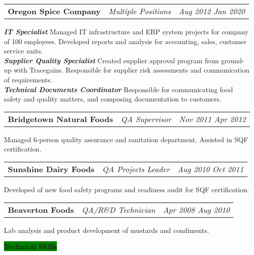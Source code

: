 \documentclass[letterpaper,12pt]{article}[leftmargin=*]
\newcommand{\skills}[2]{\vspace{6pt}
  \colorbox{Green}{\color{white}#1\hspace{9pt}\raggedbottom\normalsize\textbf{#2\hspace{4pt}}}
}
\newcommand{\resumeSectionStart}{\begin{itemize}[leftmargin=0.1in]}
\newcommand{\resumeSectionEnd}{\end{itemize}}
\newcommand{\resumeExperience}[3]{
  \vspace{-6pt}
  \item[]
    \begin{tabularx}{0.97\textwidth}{>{\raggedright}X >{\raggedright\arraybackslash}X >{\raggedleft\arraybackslash}X}
      \textbf{\color{primary}#1} & \textit{\color{accent}#2} & \textit{\color{accent}\small#3} \\
  \end{tabularx}
    
}
\begin{document}
\resumeSectionStart{
  \resumeExperience{Oregon Spice Company}{Multiple Positions}{Aug 2012 \textemdash{} Jan 2020}
  \textbf{\textit{\color{accent}IT Specialist}} \textemdash{} Managed IT infrastructure and ERP system projects for company of 100 employees. Developed reports and analysis for accounting, sales, customer service units. \\
  \textbf{\textit{\color{accent}Supplier Quality Specialist}} \textemdash{} Created supplier approval program from ground-up with Tracegains. Responsible for supplier risk assessments and communication of requirements. \\
  \textbf{\textit{\color{accent}Technical Documents Coordinator}} \textemdash{} Responsible for communicating food safety and quality matters, and composing documentation to customers.
}
\vspace{-6pt}
\resumeSectionEnd{}

\resumeSectionStart{
  \resumeExperience{Bridgetown Natural Foods}{QA Supervisor}{Nov 2011 \textemdash{} Apr 2012}
  Managed 6-person quality assurance and sanitation department. Assisted in SQF certification.
}
\vspace{-6pt}
\resumeSectionEnd{}

\resumeSectionStart{
  \resumeExperience{Sunshine Dairy Foods}{QA Projects Leader}{Aug 2010 \textemdash{} Oct 2011}
  Developed of new food safety programs and readiness audit for SQF certification.
}
\vspace{-6pt}
\resumeSectionEnd{}

\resumeSectionStart{
  \resumeExperience{Beaverton Foods}{QA/R\&D Technician}{Apr 2008 \textemdash{} Aug 2010}
  Lab analysis and product development of mustards and condiments.
}
\vspace{-6pt}
\resumeSectionEnd{}



\skills{\faGears}{Technical Skills}
\end{document}
